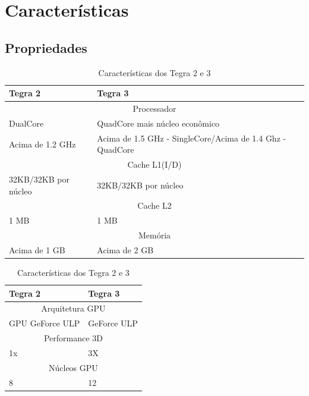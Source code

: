 \documentclass{beamer}
\begin{document}
\section{Caracter\'isticas}

\subsection{Propriedades}
\begin{frame}
  \begin{table}
    \centering
    \caption{Caracter\'isticas dos Tegra 2 e 3}
    \begin{tabular}{|p{5cm}|p{5cm}|}
      \hline
      Tegra 2 & Tegra 3 \\
      \hline
      \multicolumn{2}{|c|}{Processador} \\
      \hline
      DualCore  & QuadCore mais n\'ucleo econ\^omico \\
      \hline
      Acima de 1.2 GHz  & Acima de 1.5 GHz - SingleCore/Acima de 1.4 Ghz - QuadCore \\
      \hline
      \multicolumn{2}{|c|}{Cache  L1(I/D)} \\
      \hline
      32KB/32KB por n\'ucleo & 32KB/32KB por n\'ucleo \\
      \hline
      \multicolumn{2}{|c|}{Cache  L2} \\
      \hline
      1 MB & 1 MB\\
      \hline
      \multicolumn{2}{|c|}{Mem\'oria} \\
      \hline
      Acima de 1 GB & Acima de 2 GB\\
      \hline
    \end{tabular}
  \end{table}
\end{frame}

\begin{frame}
 \begin{table}
    \centering
    \caption{Caracter\'isticas dos Tegra 2 e 3}
    \begin{tabular}{|p{5cm}|p{5cm}|}
      \hline
      Tegra 2 & Tegra 3 \\
      \hline
      \multicolumn{2}{|c|}{Arquitetura GPU} \\
      \hline
      GPU GeForce ULP & GeForce ULP\\
      \hline
      \multicolumn{2}{|c|}{Performance 3D} \\
      \hline
      1x & 3X\\
      \hline
      \multicolumn{2}{|c|}{N\'ucleos GPU} \\
      \hline
      8 & 12\\
      \hline     
    \end{tabular}
  \end{table}
\end{frame}
\end{document}
